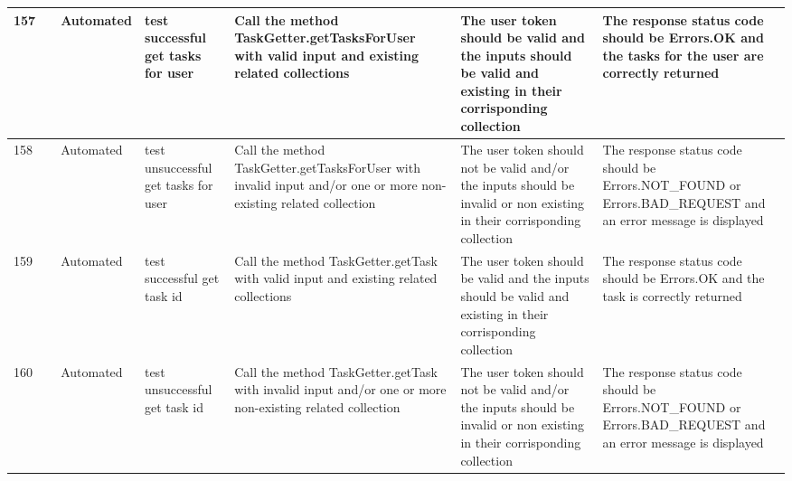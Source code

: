 \documentclass{article}
\begin{document}
{\begin{tabular}{|
    >{\columncolor[HTML]{FFFFFF}}l |
    >{\columncolor[HTML]{FFFFFF}}c |
    >{\columncolor[HTML]{FFFFFF}}l |l|l|l|l|}
    157                                 & \cellcolor[HTML]{FFFFFF}                                    & {\color[HTML]{11734B} Automated} & test successful get tasks for user                  & Call the method TaskGetter.getTasksForUser with valid input and existing related collections                               & The user token should be valid and the inputs should be valid and existing in their corrisponding collection                                             & The response status code should be Errors.OK and the tasks for the user are correctly returned                \\ \cline{1-1} \cline{3-7} 
    158                                 & \cellcolor[HTML]{FFFFFF}                                    & {\color[HTML]{11734B} Automated} & test unsuccessful get tasks for user                & Call the method TaskGetter.getTasksForUser with invalid input and/or one or more non-existing related collection           & The user token should not be valid and/or the inputs should be invalid or non existing in their corrisponding collection                                 & The response status code should be Errors.NOT\_FOUND or Errors.BAD\_REQUEST and an error message is displayed \\ \cline{1-1} \cline{3-7} 
    159                                 & \cellcolor[HTML]{FFFFFF}                                    & {\color[HTML]{11734B} Automated} & test successful get task id                         & Call the method TaskGetter.getTask with valid input and existing related collections                                       & The user token should be valid and the inputs should be valid and existing in their corrisponding collection                                             & The response status code should be Errors.OK and the task is correctly returned                               \\ \cline{1-1} \cline{3-7} 
    160                                 & \multirow{-36}{*}{\cellcolor[HTML]{FFFFFF}Test TaskManager} & {\color[HTML]{11734B} Automated} & test unsuccessful get task id                       & Call the method TaskGetter.getTask with invalid input and/or one or more non-existing related collection                   & The user token should not be valid and/or the inputs should be invalid or non existing in their corrisponding collection                                 & The response status code should be Errors.NOT\_FOUND or Errors.BAD\_REQUEST and an error message is displayed \\ \hline
    \end{tabular}
}
\end{document}
